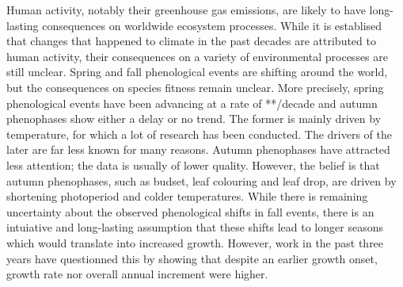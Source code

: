 \documentclass{article}
\begin{document}
Human activity, notably their greenhouse gas emissions, are likely to have long-lasting consequences on worldwide ecosystem processes. While it is establised that changes that happened to climate in the past decades are attributed to human activity, their consequences on a variety of environmental processes are still unclear. Spring and fall phenological events are shifting around the world, but the consequences on species fitness remain unclear. More precisely, spring phenological events have been advancing at a rate of **/decade and autumn phenophases show either a delay or no trend. The former is mainly driven by temperature, for which a lot of research has been conducted. The drivers of the later are far less known for many reasons. Autumn phenophases have attracted less attention; the data is usually of lower quality. However, the belief is that autumn phenophases, such as budset, leaf colouring and leaf drop, are driven by shortening photoperiod and colder temperatures. While there is remaining uncertainty about the observed phenological shifts in fall events, there is an intuiative and long-lasting assumption that these shifts lead to longer seasons which would translate into increased growth. However, work in the past three years have questionned this by showing that despite an earlier growth onset, growth rate nor overall annual increment were higher.
\par
\end{document}
